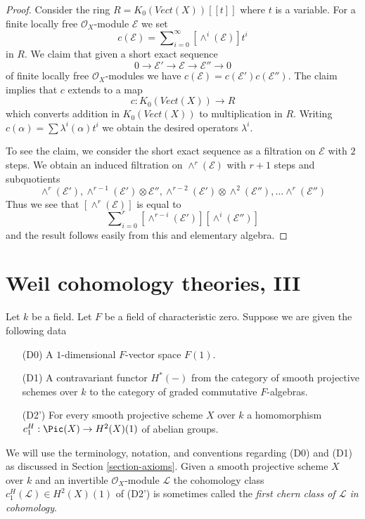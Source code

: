 \begin{proof}
Consider the ring $R = K_0(\textit{Vect}(X))[[t]]$ where $t$ is a
variable. For a finite locally free $\mathcal{O}_X$-module
$\mathcal{E}$ we set
$$
c(\mathcal{E}) = \sum\nolimits_{i = 0}^\infty [\wedge^i(\mathcal{E})] t^i
$$
in $R$. We claim that given a short exact sequence
$$
0 \to \mathcal{E}' \to \mathcal{E} \to \mathcal{E}'' \to 0
$$
of finite locally free $\mathcal{O}_X$-modules
we have $c(\mathcal{E}) = c(\mathcal{E}') c(\mathcal{E}'')$.
The claim implies that $c$ extends to a map
$$
c :  K_0(\textit{Vect}(X)) \longrightarrow R
$$
which converts addition in $K_0(\textit{Vect}(X))$ to multiplication in $R$.
Writing $c(\alpha) = \sum \lambda^i(\alpha) t^i$ we obtain the desired
operators $\lambda^i$.

\medskip\noindent
To see the claim, we consider the short exact sequence as a
filtration on $\mathcal{E}$ with $2$ steps. We obtain an induced
filtration on $\wedge^r(\mathcal{E})$ with $r + 1$ steps and
subquotients
$$
\wedge^r(\mathcal{E}'),
\wedge^{r - 1}(\mathcal{E}') \otimes \mathcal{E}'',
\wedge^{r - 2}(\mathcal{E}') \otimes \wedge^2(\mathcal{E}''), \ldots
\wedge^r(\mathcal{E}'')
$$
Thus we see that $[\wedge^r(\mathcal{E})]$ is equal to
$$
\sum\nolimits_{i = 0}^r
[\wedge^{r - i}(\mathcal{E}')] [\wedge^i(\mathcal{E}'')]
$$
and the result follows easily from this and elementary algebra.
\end{proof}










\section{Weil cohomology theories, III}
\label{section-c1}

\noindent
Let $k$ be a field. Let $F$ be a field of characteristic zero.
Suppose we are given the following data
\begin{enumerate}
\item[(D0)] A $1$-dimensional $F$-vector space $F(1)$.
\item[(D1)] A contravariant functor $H^*(-)$ from the category of smooth
projective schemes over $k$ to the category of graded commutative
$F$-algebras.
\item[(D2')] For every smooth projective scheme $X$ over $k$ a homomorphism
$c_1^H : \Pic(X) \to H^2(X)(1)$ of abelian groups.
\end{enumerate}
We will use the terminology, notation, and conventions regarding
(D0) and (D1) as discussed in Section \ref{section-axioms}.
Given a smooth projective scheme $X$ over $k$ and an invertible
$\mathcal{O}_X$-module $\mathcal{L}$ the cohomology class
$c_1^H(\mathcal{L}) \in H^2(X)(1)$ of (D2')
is sometimes called the {\it first chern class of $\mathcal{L}$
in cohomology}.

